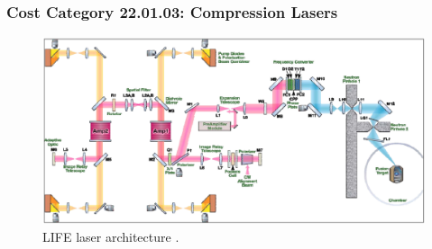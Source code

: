 \subsubsection*{Cost Category 22.01.03: Compression Lasers}





\begin{figure}
    \centering
    \includegraphics[width=0.9\linewidth]{Figures/Bayrmanian2011.png}
    \caption{LIFE laser architecture \cite{Bayramian2011}.}
    \label{fig:bayramian}
\end{figure}



